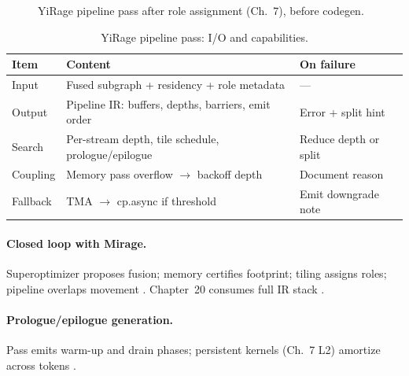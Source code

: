 \begin{figure}[t]
\centering
{}
\caption{YiRage pipeline pass after role assignment (Ch.~7), before codegen.}
\label{fig:ch08_yirage_pipeline_pass}
\end{figure}

\begin{table}[t]
\centering
\small
\caption{YiRage pipeline pass: I/O and capabilities.}
\label{tab:ch08_pipeline_pass_io}
\begin{tabular}{@{}p{2.4cm}p{5.0cm}p{3.2cm}@{}}
\toprule
\textbf{Item} & \textbf{Content} & \textbf{On failure} \\
\midrule
Input & Fused subgraph + residency + role metadata & --- \\
Output & Pipeline IR: buffers, depths, barriers, emit order & Error + split hint \\
Search & Per-stream depth, tile schedule, prologue/epilogue & Reduce depth or split \\
Coupling & Memory pass overflow $\rightarrow$ backoff depth & Document reason \\
Fallback & TMA $\rightarrow$ cp.async if threshold & Emit downgrade note \\
\bottomrule
\end{tabular}
\end{table}

\paragraph{Closed loop with Mirage.}
Superoptimizer proposes fusion; memory certifies footprint; tiling assigns roles; pipeline overlaps movement \citep{wu2024mirage,mpk2025,yirage2026,shah2024flashattention3}.
Chapter~20 consumes full IR stack \citep{mpk2025,chen2020compilerbasedhardw}.

\paragraph{Prologue/epilogue generation.}
Pass emits warm-up and drain phases; persistent kernels (Ch.~7 L2) amortize across tokens \citep{shah2024flashattention3,mpk2025,nvidia2024cudagraphs,patel2025llminference}.

